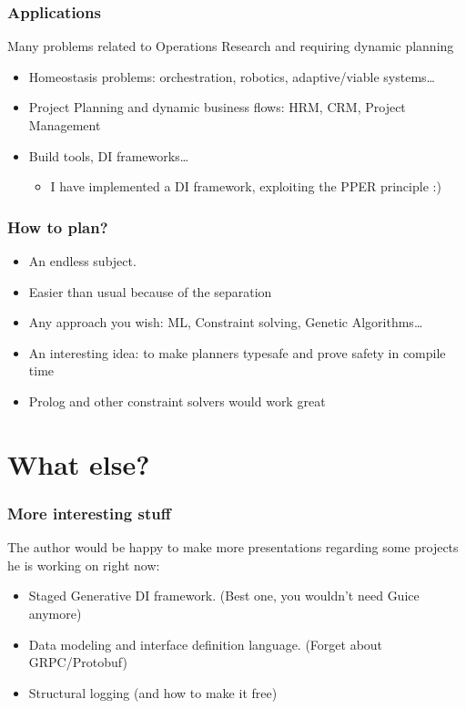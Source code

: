 \documentclass{beamer}
\begin{document}
\begin{frame}
    \frametitle{Applications}  
    Many problems related to Operations Research and requiring dynamic planning
\begin{itemize}
    \item Homeostasis problems: orchestration, robotics, adaptive/viable systems\dots
    \item Project Planning and dynamic business flows: HRM, CRM, Project Management
    \item Build tools, DI frameworks\dots 
    \begin{itemize}
        \item I have implemented a DI framework, exploiting the PPER principle :)
    \end{itemize}   
\end{itemize}
\end{frame}


\begin{frame}
    \frametitle{How to plan?}  
\begin{itemize}
    \item An endless subject.
    \item Easier than usual because of the separation
    \item Any approach you wish: ML, Constraint solving, Genetic Algorithms\dots
    \item An interesting idea: to make planners typesafe and prove safety in compile time
    \item Prolog and other constraint solvers would work great  
\end{itemize}
\end{frame}

\section{What else?}
\begin{frame}
    \frametitle{More interesting stuff}
    
    The author would be happy to make more presentations 
    regarding some projects he is working on right now:

    \begin{itemize}
        \item Staged Generative DI framework. (Best one, you wouldn't need Guice anymore)
        \item Data modeling and interface definition language. (Forget about GRPC/Protobuf)
        \item Structural logging (and how to make it free)
    \end{itemize}
\end{frame}
\end{document}

